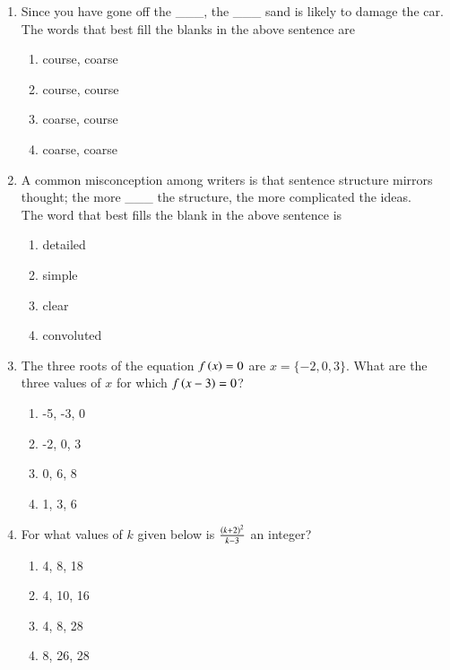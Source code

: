 \documentclass[journal,9pt,onecolumn]{IEEEtran}
\begin{document}
\begin{enumerate}

\item Since you have gone off the \_\_\_, the \_\_\_ sand is likely to damage the car. \\
The words that best fill the blanks in the above sentence are \hfill {}
\begin{multicols}{4}
    \begin{enumerate}
        \item course, coarse 
        \item course, course 
        \item coarse, course 
        \item coarse, coarse 
    \end{enumerate}
\end{multicols}

\item A common misconception among writers is that sentence structure mirrors thought; the more \_\_\_ the structure, the more complicated the ideas. \\
The word that best fills the blank in the above sentence is \hfill {}
\begin{multicols}{4}
    \begin{enumerate}
        \item detailed 
        \item simple 
        \item clear 
        \item convoluted 
    \end{enumerate}
\end{multicols}


\item The three roots of the equation $f\left(x\right) = 0$ are $x = \{-2,0,3\}$. What are the three values of $x$ for which $f\left(x-3\right) = 0$? \hfill {}
\begin{multicols}{4}
    \begin{enumerate}
        \item -5, -3, 0 
        \item -2, 0, 3 
        \item 0, 6, 8 
        \item 1, 3, 6 
    \end{enumerate}
\end{multicols}


\item For what values of $k$ given below is $\frac{\left(k+2\right)^2}{k-3}$
an integer? \hfill {}
\begin{multicols}{4}
    \begin{enumerate}
        \item 4, 8, 18 
        \item 4, 10, 16 
        \item 4, 8, 28 
        \item 8, 26, 28 
    \end{enumerate}
\end{multicols}


\end{enumerate}
\end{document}
